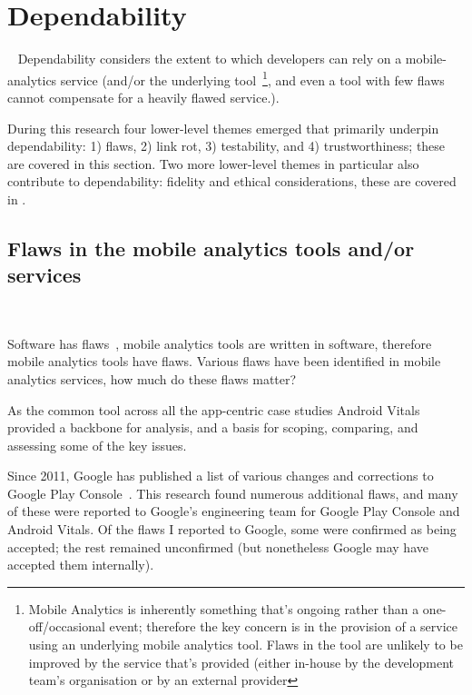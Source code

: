 \section{Dependability}~\label{section-dependability}
Dependability considers the extent to which developers can rely on a mobile-analytics service (and/or the underlying tool~\footnote{Mobile Analytics is inherently something that's ongoing rather than a one-off/occasional event; therefore the key concern is in the provision of a service using an underlying mobile analytics tool. Flaws in the tool are unlikely to be improved by the service that's provided (either in-house by the development team's organisation or by an external provider}, and even a tool with few flaws cannot compensate for a heavily flawed service.). 

During this research four lower-level themes emerged that primarily underpin dependability: 1) flaws, 2) link rot, 3) testability, and 4) trustworthiness; these are covered in this section. Two more lower-level themes in particular also contribute to dependability: fidelity and ethical considerations, these are covered in .

\subsection{Flaws in the mobile analytics tools and/or services}~\label{tata-flaws-topic}

Software has flaws~, mobile analytics tools are written in software, therefore mobile analytics tools have flaws. %
Various flaws have been identified in mobile analytics services, how much do these flaws matter? 

As the common tool across all the app-centric case studies Android Vitals provided a backbone for analysis, and a basis for scoping, comparing, and assessing some of the key issues.

Since 2011, Google has published a list of various changes and corrections to Google Play Console~. This research found numerous additional flaws, and many of these were reported to Google's engineering team for Google Play Console and Android Vitals. Of the flaws I reported to Google, some were confirmed as being accepted; the rest remained unconfirmed (but nonetheless Google may have accepted them internally).  %

